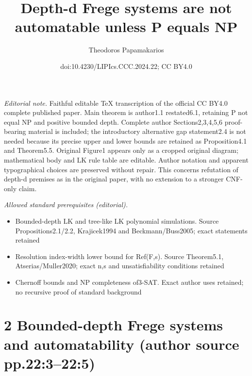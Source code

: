 \documentclass[10pt,a4paper]{article}
\title{Depth-d Frege systems are not automatable unless P equals NP}
\author{Theodoros Papamakarios}
\date{doi:10.4230/LIPIcs.CCC.2024.22; CC BY4.0}
\begin{document}
\maketitle
\noindent\textit{Editorial note.} Faithful editable TeX transcription of the official CC BY4.0 complete published paper. Main theorem is author1.1 restated6.1, retaining P not equal NP and positive bounded depth. Complete author Sections2,3,4,5,6 proof-bearing material is included; the introductory alternative gap statement2.4 is not needed because its precise upper and lower bounds are retained as Proposition4.1 and Theorem5.5. Original Figure1 appears only as a cropped original diagram; mathematical body and LK rule table are editable. Author notation and apparent typographical choices are preserved without repair. This concerns refutation of depth-d premises as in the original paper, with no extension to a stronger CNF-only claim.\par\medskip
\noindent\textit{Allowed standard prerequisites (editorial).}\begin{itemize}
\item Bounded-depth LK and tree-like LK polynomial simulations. Source Propositions2.1/2.2, Krajicek1994 and Beckmann/Buss2005; exact statements retained
\item Resolution index-width lower bound for Ref(F,s). Source Theorem5.1, Atserias/Muller2020; exact n,s and unsatisfiability conditions retained
\item Chernoff bounds and NP completeness of3-SAT. Exact author uses retained; no recursive proof of standard background
\end{itemize}\medskip
\section*{2 Bounded-depth Frege systems and automatability (author source pp.22:3--22:5)}
\end{document}
